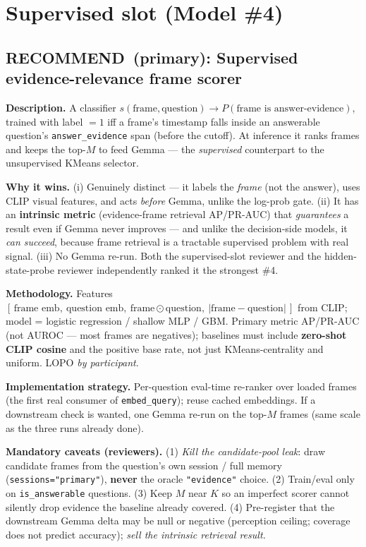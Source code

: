 \documentclass[11pt]{article}
\newcommand{\rec}{\textbf{\color{hsgreen}RECOMMEND}}
\newcommand{\code}[1]{\texttt{#1}}
\begin{document}
\section{Supervised slot (Model \#4)}

\subsection{\rec\ (primary): Supervised evidence-relevance frame scorer}
\textbf{Description.} A classifier $s(\text{frame},\text{question})\to P(\text{frame is answer-evidence})$, trained with label $=1$ iff a frame's timestamp falls inside an answerable question's \code{answer\_evidence} span (before the cutoff). At inference it ranks frames and keeps the top-$M$ to feed Gemma --- the \emph{supervised} counterpart to the unsupervised KMeans selector.

\textbf{Why it wins.} (i) Genuinely distinct --- it labels the \emph{frame} (not the answer), uses CLIP visual features, and acts \emph{before} Gemma, unlike the log-prob gate. (ii) It has an \textbf{intrinsic metric} (evidence-frame retrieval AP/PR-AUC) that \emph{guarantees} a result even if Gemma never improves --- and unlike the decision-side models, it \emph{can succeed}, because frame retrieval is a tractable supervised problem with real signal. (iii) No Gemma re-run. Both the supervised-slot reviewer and the hidden-state-probe reviewer independently ranked it the strongest \#4.

\textbf{Methodology.} Features $[\,\text{frame emb},\ \text{question emb},\ \text{frame}\odot\text{question},\ |\text{frame}-\text{question}|\,]$ from CLIP; model = logistic regression / shallow MLP / GBM. Primary metric AP/PR-AUC (not AUROC --- most frames are negatives); baselines must include \textbf{zero-shot CLIP cosine} and the positive base rate, not just KMeans-centrality and uniform. LOPO \emph{by participant}.

\textbf{Implementation strategy.} Per-question eval-time re-ranker over loaded frames (the first real consumer of \code{embed\_query}); reuse cached embeddings. If a downstream check is wanted, one Gemma re-run on the top-$M$ frames (same scale as the three runs already done).

\textbf{Mandatory caveats (reviewers).} (1) \emph{Kill the candidate-pool leak}: draw candidate frames from the question's own session / full memory (\code{sessions="primary"}), \textbf{never} the oracle \code{"evidence"} choice. (2) Train/eval only on \code{is\_answerable} questions. (3) Keep $M$ near $K$ so an imperfect scorer cannot silently drop evidence the baseline already covered. (4) Pre-register that the downstream Gemma delta may be null or negative (perception ceiling; coverage does not predict accuracy); \emph{sell the intrinsic retrieval result.}
\end{document}
